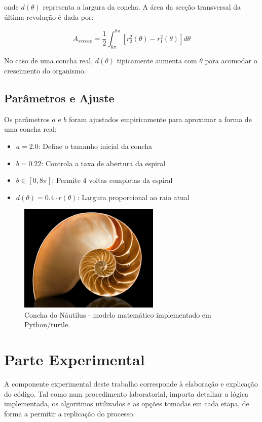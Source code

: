 \documentclass[12pt,a4paper,oneside]{extarticle}
\begin{document}
onde $d(\theta)$ representa a largura da concha. A área da secção transversal da última revolução é dada por:

\begin{equation}
A_{seccao} = \frac{1}{2}\int_{6\pi}^{8\pi} [r_2^2(\theta) - r_1^2(\theta)] d\theta
\label{eq:area_seccao}
\end{equation}

No caso de uma concha real, $d(\theta)$ tipicamente aumenta com $\theta$ para acomodar o crescimento do organismo.

\subsection{Parâmetros e Ajuste}
Os parâmetros $a$ e $b$ foram ajustados empiricamente para aproximar a forma de uma concha real:
\begin{itemize}
    \item $a = 2.0$: Define o tamanho inicial da concha
    \item $b = 0.22$: Controla a taxa de abertura da espiral
    \item $\theta \in [0, 8\pi]$: Permite 4 voltas completas da espiral
    \item $d(\theta) = 0.4 \cdot r(\theta)$: Largura proporcional ao raio atual
\end{itemize}

\begin{figure}[ht!]
    \centering
    \includegraphics[width=0.6\textwidth]{figuras/nautilus.png}
    \caption{Concha do Náutilus - modelo matemático implementado em Python/turtle.}
    \label{fig:referencia}
\end{figure}

\section{Parte Experimental}
A componente experimental deste trabalho corresponde à elaboração e explicação do código.  
Tal como num procedimento laboratorial, importa detalhar a lógica implementada, os algoritmos utilizados e as opções tomadas em cada etapa, de forma a permitir a replicação do processo.  
\end{document}
